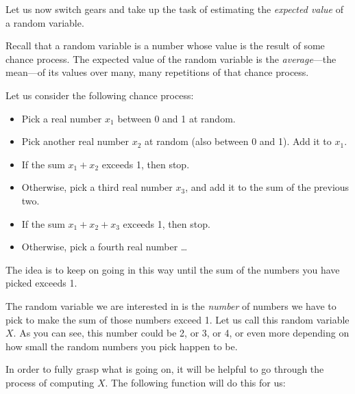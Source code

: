 \documentclass[]{book}
\providecommand{\tightlist}{%
  \setlength{\itemsep}{0pt}\setlength{\parskip}{0pt}}
\theoremstyle{definition}
\theoremstyle{definition}
\theoremstyle{definition}
\theoremstyle{remark}
\begin{document}
{Let us now switch gears and take up the task of estimating the
\emph{expected value} of a random variable.

Recall that a random variable is a number whose value is the result of
some chance process. The expected value of the random variable is the
\emph{average}---the mean---of its values over many, many repetitions of
that chance process.

Let us consider the following chance process:

\begin{itemize}
\tightlist
\item
  Pick a real number \(x_1\) between 0 and 1 at random.
\item
  Pick another real number \(x_2\) at random (also between 0 and 1). Add
  it to \(x_1\).
\item
  If the sum \(x_1 + x_2\) exceeds 1, then stop.
\item
  Otherwise, pick a third real number \(x_3\), and add it to the sum of
  the previous two.
\item
  If the sum \(x_1+x_2+x_3\) exceeds 1, then stop.
\item
  Otherwise, pick a fourth real number \ldots{}
\end{itemize}

The idea is to keep on going in this way until the sum of the numbers
you have picked exceeds 1.

The random variable we are interested in is the \emph{number} of numbers
we have to pick to make the sum of those numbers exceed 1. Let us call
this random variable \(X\). As you can see, this number could be 2, or
3, or 4, or even more depending on how small the random numbers you pick
happen to be.

In order to fully grasp what is going on, it will be helpful to go
through the process of computing \(X\). The following function will do
this for us:

}
\end{document}

